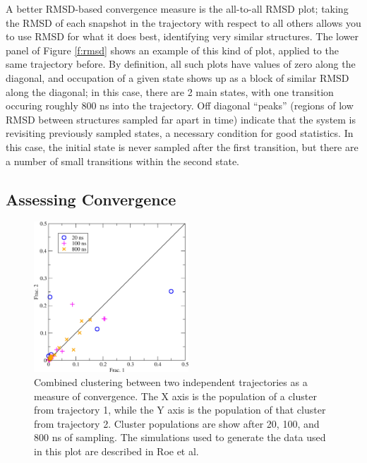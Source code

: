 A better RMSD-based convergence measure is the all-to-all RMSD plot; taking the
RMSD of each snapshot in the trajectory with respect to all others allows you to
use RMSD for what it does best, identifying very similar structures.  The lower
panel of Figure \ref{f:rmsd} shows an example of this kind of plot, applied to
the same trajectory before.  By definition, all such plots have values of zero
along the diagonal, and occupation of a given state shows up as a block of
similar RMSD along the diagonal; in this case, there are 2 main states, with one
transition occuring roughly 800 ns into the trajectory.  Off diagonal ``peaks''
(regions of low RMSD between structures sampled far apart in time) indicate that
the system is revisiting previously sampled states, a necessary condition for
good statistics.  In this case, the initial state is never sampled after the
first transition, but there are a number of small transitions within the second
state.

\subsection{Assessing Convergence}

\begin{figure}
  \includegraphics[width=5.8cm]{figures/combinedcluster/combinedcluster}
  \caption{
  \label{f:combinedcluster} Combined clustering between two independent trajectories as a measure of convergence. The X axis is the population of a cluster from trajectory 1, while the Y axis is the population of that cluster from trajectory 2. Cluster populations are show after 20, 100, and 800 ns of sampling. The simulations used to generate the data used in this plot are described in Roe et al.\citep{Roe2014}
  }
\end{figure}

